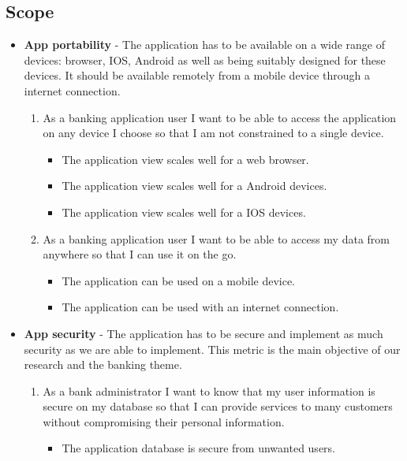     \subsection{Scope}
    \begin{itemize}
    \item \textbf{App portability} - The application has to be available on a wide range of devices: browser, IOS, Android as well as being suitably designed for these devices. It should be available remotely from a mobile device through a internet connection.
        \begin{enumerate}
        \item As a banking application user I want to be able to access the application on any device I choose so that I am not constrained to a single device.
        \begin{itemize}
                \item The application view scales well for a web browser.
                \item The application view scales well for a Android devices.
                \item The application view scales well for a IOS devices.
            \end{itemize}
        \item As a banking application user I want to be able to access my data from anywhere so that I can use it on the go.
            \begin{itemize}
                \item The application can be used on a mobile device.
                \item The application can be used with an internet connection.
            \end{itemize}
        \end{enumerate}
    \item  \textbf{App security} - The application has to be secure and implement as much security as we are able to implement. This metric is the main objective of our research and the banking theme.
        \begin{enumerate}
        \item As a bank administrator I want to know that my user information is secure on my database so that I can provide services to many customers without compromising their personal information.
        \begin{itemize}
                \item The application database is secure from unwanted users.

\end{itemize}
\end{enumerate}
\end{itemize}
